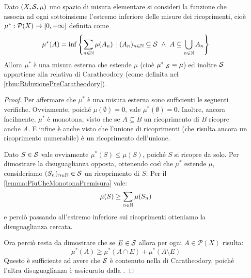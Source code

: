 \begin{proposition}\label{prop:MisuraEsternaDiPremisura}
	Dato $(X,\S,\mu)$ uno spazio di misura elementare si consideri la funzione che associa ad ogni sottoinsieme l'estremo inferiore delle misure dei ricoprimenti, cioè $\mu^*:\mathcal P(X)\to\Rpiu$ definita come 
	\begin{equation*}
		\mu^*(A)=\inf\left\{\sum_{n\in\N} \mu(A_n)\ |\ (A_n)_{n\in\N}\subseteq\S\ \wedge
		\ A\subseteq\bigcup_{n\in\N}A_n\right\}
	\end{equation*}
	Allora $\mu^*$ è una misura esterna che estende $\mu$ (cioè $\mu^*|_\S=\mu$) ed inoltre $\S$ appartiene alla relativa \sigalg{} di Caratheodory (come definita nel \cref{thm:RiduzionePreCaratheodory}).
\end{proposition}
\begin{proof}
	Per affermare che $\mu^*$ è una misura esterna sono sufficienti le seguenti verifiche.
	Ovviamente, poiché $\mu(\emptyset)=0$, vale $\mu^*(\emptyset)=0$. 
	Inoltre, ancora facilmente, $\mu^*$ è monotona, visto che se $A\subseteq B$ un ricoprimento di $B$ ricopre anche $A$.
	E infine è anche \sigsubadd{} visto che l'unione di ricoprimenti (che risulta ancora un ricoprimento numerabile) è un ricoprimento dell'unione.
	
	Dato $S\in\S$ vale ovviamente $\mu^*(S)\le\mu(S)$, poiché $S$ si ricopre da solo. Per dimostrare la disuguaglianza opposta, ottenendo così che $\mu^*$ estende $\mu$, consideriamo $(S_n)_{n\in\N}\in \S$ un ricoprimento di $S$. Per il \cref{lemma:PiuCheMonotonaPremisura} vale:
	\begin{equation*}
		\mu(S)\ge \sum_{n\in\N} \mu(S_n)
	\end{equation*}
	e perciò passando all'estremo inferiore sui ricoprimenti otteniamo la disuguaglianza cercata.
	
	Ora perciò resta da dimostrare che se $E\in \S$ allora per ogni $A\in\mathcal P(X)$ risulta:
	\begin{equation}\label{eq:MisuraEsternaDisDifficile}
		\mu^*(A) \ge \mu^*(A\cap E)+\mu^*(A\setminus E)
	\end{equation}
	Questo è sufficiente ad avere che $\S$ è contenuto nella \sigalg{} di Caratheodory, poiché l'altra disuguaglianza è assicurata dalla \sigsubadd[ità].
	

\end{proof}
